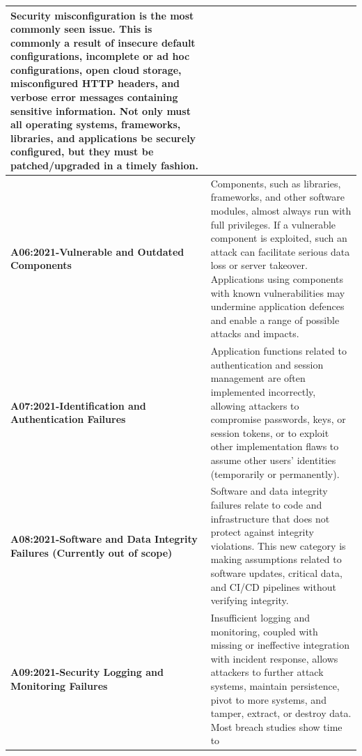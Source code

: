 \documentclass{article}
\begin{document}
\begin{center}
\begin{longtable} {|>{\raggedright\arraybackslash}p{10em}|p{30em}|}
                \normalsize Security misconfiguration is the most commonly seen issue. This is commonly a result of
                insecure default configurations, incomplete or ad hoc configurations, open cloud storage,
                misconfigured HTTP headers, and verbose error messages containing sensitive
                information. Not only must all operating systems, frameworks, libraries, and applications
                be securely configured, but they must be patched/upgraded in a timely fashion. \\
                \hline
                \normalsize \textbf{A06:2021-Vulnerable and Outdated Components} & 
                \normalsize Components, such as libraries, frameworks, and other software modules, almost always
                run with full privileges. If a vulnerable component is exploited, such an attack can facilitate
                serious data loss or server takeover. Applications using components with known
                vulnerabilities may undermine application defences and enable a range of possible attacks
                and impacts. \\
                \hline
                \normalsize \textbf{A07:2021-Identification and Authentication Failures} & 
                \normalsize Application functions related to authentication and session management are often
                implemented incorrectly, allowing attackers to compromise passwords, keys, or session
                tokens, or to exploit other implementation flaws to assume other users' identities
                (temporarily or permanently). \\
                \hline
                \normalsize \textbf{A08:2021-Software and Data Integrity Failures (Currently out of scope)} & 
                \normalsize Software and data integrity failures relate to code and infrastructure that does not protect
                against integrity violations. This new category is making assumptions related to software
                updates, critical data, and CI/CD pipelines without verifying integrity. \\
                \hline
                \normalsize \textbf{A09:2021-Security Logging and Monitoring Failures} & 
                \normalsize Insufficient logging and monitoring, coupled with missing or ineffective integration with
                incident response, allows attackers to further attack systems, maintain persistence, pivot
                to more systems, and tamper, extract, or destroy data. Most breach studies show time to

\end{longtable}
\end{center}
\end{document}
